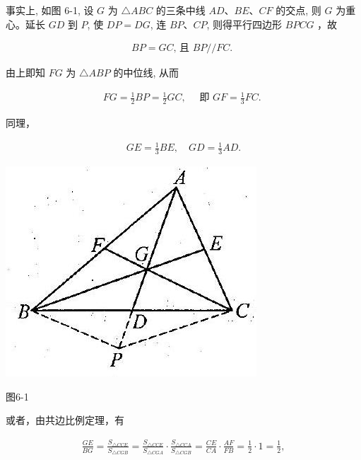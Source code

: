 \documentclass[10pt]{article}
\begin{document}
事实上, 如图 6-1, 设 $G$ 为 $\triangle A B C$ 的三条中线 $A D 、 B E 、 C F$ 的交点, 则 $G$ 为重心。延长 $G D$ 到 $P$, 使 $D P=D G$, 连 $B P 、 C P$, 则得平行四边形 $B P C G$ ，故

\begin{align*}
B P=G C \text {, 且 } B P / / F C \text {. }
\end{align*}

由上即知 $F G$ 为 $\triangle A B P$ 的中位线, 从而

\begin{align*}
F G=\frac{1}{2} B P=\frac{1}{2} G C, \quad \text { 即 } G F=\frac{1}{3} F C \text {. }
\end{align*}

同理，

\begin{align*}
G E=\frac{1}{3} B E, \quad G D=\frac{1}{3} A D .
\end{align*}

\begin{center}
\includegraphics[max width=\textwidth]{2024_10_30_2c8f45efd4a519b08e1ag-056}
\end{center}

图6-1

或者，由共边比例定理，有

\begin{align*}
\frac{G E}{B G}=\frac{S_{\triangle C C E}}{S_{\triangle C G B}}=\frac{S_{\triangle C C E}}{S_{\triangle C G A}} \cdot \frac{S_{\triangle C C A}}{S_{\triangle C G B}}=\frac{C E}{C A} \cdot \frac{A F}{F B}=\frac{1}{2} \cdot 1=\frac{1}{2},
\end{align*}
\end{document}
